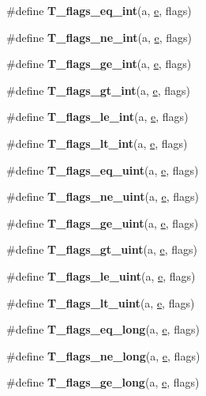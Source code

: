 \begin{DoxyCompactItemize}
\#define {\bfseries T\+\_\+flags\+\_\+eq\+\_\+int}(a,  \mbox{\hyperlink{sun4u_2tte_8h_a8b0b9ed08e0e18920ec2682f48228c27}{e}},  flags)
\item 
\#define {\bfseries T\+\_\+flags\+\_\+ne\+\_\+int}(a,  \mbox{\hyperlink{sun4u_2tte_8h_a8b0b9ed08e0e18920ec2682f48228c27}{e}},  flags)
\item 
\#define {\bfseries T\+\_\+flags\+\_\+ge\+\_\+int}(a,  \mbox{\hyperlink{sun4u_2tte_8h_a8b0b9ed08e0e18920ec2682f48228c27}{e}},  flags)
\item 
\#define {\bfseries T\+\_\+flags\+\_\+gt\+\_\+int}(a,  \mbox{\hyperlink{sun4u_2tte_8h_a8b0b9ed08e0e18920ec2682f48228c27}{e}},  flags)
\item 
\#define {\bfseries T\+\_\+flags\+\_\+le\+\_\+int}(a,  \mbox{\hyperlink{sun4u_2tte_8h_a8b0b9ed08e0e18920ec2682f48228c27}{e}},  flags)
\item 
\#define {\bfseries T\+\_\+flags\+\_\+lt\+\_\+int}(a,  \mbox{\hyperlink{sun4u_2tte_8h_a8b0b9ed08e0e18920ec2682f48228c27}{e}},  flags)
\item 
\#define {\bfseries T\+\_\+flags\+\_\+eq\+\_\+uint}(a,  \mbox{\hyperlink{sun4u_2tte_8h_a8b0b9ed08e0e18920ec2682f48228c27}{e}},  flags)
\item 
\#define {\bfseries T\+\_\+flags\+\_\+ne\+\_\+uint}(a,  \mbox{\hyperlink{sun4u_2tte_8h_a8b0b9ed08e0e18920ec2682f48228c27}{e}},  flags)
\item 
\#define {\bfseries T\+\_\+flags\+\_\+ge\+\_\+uint}(a,  \mbox{\hyperlink{sun4u_2tte_8h_a8b0b9ed08e0e18920ec2682f48228c27}{e}},  flags)
\item 
\#define {\bfseries T\+\_\+flags\+\_\+gt\+\_\+uint}(a,  \mbox{\hyperlink{sun4u_2tte_8h_a8b0b9ed08e0e18920ec2682f48228c27}{e}},  flags)
\item 
\#define {\bfseries T\+\_\+flags\+\_\+le\+\_\+uint}(a,  \mbox{\hyperlink{sun4u_2tte_8h_a8b0b9ed08e0e18920ec2682f48228c27}{e}},  flags)
\item 
\#define {\bfseries T\+\_\+flags\+\_\+lt\+\_\+uint}(a,  \mbox{\hyperlink{sun4u_2tte_8h_a8b0b9ed08e0e18920ec2682f48228c27}{e}},  flags)
\item 
\#define {\bfseries T\+\_\+flags\+\_\+eq\+\_\+long}(a,  \mbox{\hyperlink{sun4u_2tte_8h_a8b0b9ed08e0e18920ec2682f48228c27}{e}},  flags)
\item 
\#define {\bfseries T\+\_\+flags\+\_\+ne\+\_\+long}(a,  \mbox{\hyperlink{sun4u_2tte_8h_a8b0b9ed08e0e18920ec2682f48228c27}{e}},  flags)
\item 
\#define {\bfseries T\+\_\+flags\+\_\+ge\+\_\+long}(a,  \mbox{\hyperlink{sun4u_2tte_8h_a8b0b9ed08e0e18920ec2682f48228c27}{e}},  flags)

\end{DoxyCompactItemize}
